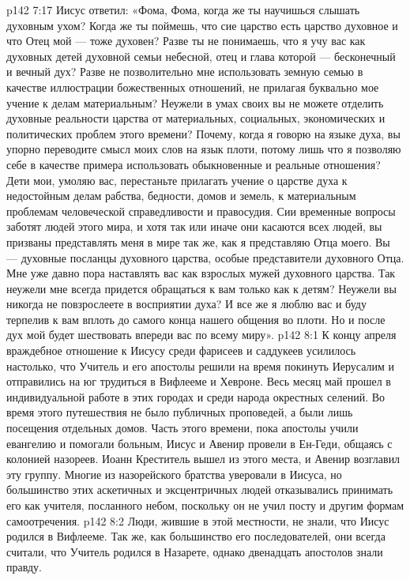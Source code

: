 \vs p142 7:17 Иисус ответил: «Фома, Фома, когда же ты научишься слышать духовным ухом? Когда же ты поймешь, что сие царство есть царство духовное и что Отец мой --- тоже духовен? Разве ты не понимаешь, что я учу вас как духовных детей духовной семьи небесной, отец и глава которой --- бесконечный и вечный дух? Разве не позволительно мне использовать земную семью в качестве иллюстрации божественных отношений, не прилагая буквально мое учение к делам материальным? Неужели в умах своих вы не можете отделить духовные реальности царства от материальных, социальных, экономических и политических проблем этого времени? Почему, когда я говорю на языке духа, вы упорно переводите смысл моих слов на язык плоти, потому лишь что я позволяю себе в качестве примера использовать обыкновенные и реальные отношения? Дети мои, умоляю вас, перестаньте прилагать учение о царстве духа к недостойным делам рабства, бедности, домов и земель, к материальным проблемам человеческой справедливости и правосудия. Сии временные вопросы заботят людей этого мира, и хотя так или иначе они касаются всех людей, вы призваны представлять меня в мире так же, как я представляю Отца моего. Вы --- духовные посланцы духовного царства, особые представители духовного Отца. Мне уже давно пора наставлять вас как взрослых мужей духовного царства. Так неужели мне всегда придется обращаться к вам только как к детям? Неужели вы никогда не повзрослеете в восприятии духа? И все же я люблю вас и буду терпелив к вам вплоть до самого конца нашего общения во плоти. Но и после дух мой будет шествовать впереди вас по всему миру».
\vs p142 8:1 К концу апреля враждебное отношение к Иисусу среди фарисеев и саддукеев усилилось настолько, что Учитель и его апостолы решили на время покинуть Иерусалим и отправились на юг трудиться в Вифлееме и Хевроне. Весь месяц май прошел в индивидуальной работе в этих городах и среди народа окрестных селений. Во время этого путешествия не было публичных проповедей, а были лишь посещения отдельных домов. Часть этого времени, пока апостолы учили евангелию и помогали больным, Иисус и Авенир провели в Ен\hyp{}Геди, общаясь с колонией назореев. Иоанн Креститель вышел из этого места, и Авенир возглавил эту группу. Многие из назорейского братства уверовали в Иисуса, но большинство этих аскетичных и эксцентричных людей отказывались принимать его как учителя, посланного небом, поскольку он не учил посту и другим формам самоотречения.
\vs p142 8:2 Люди, жившие в этой местности, не знали, что Иисус родился в Вифлееме. Так же, как большинство его последователей, они всегда считали, что Учитель родился в Назарете, однако двенадцать апостолов знали правду.
